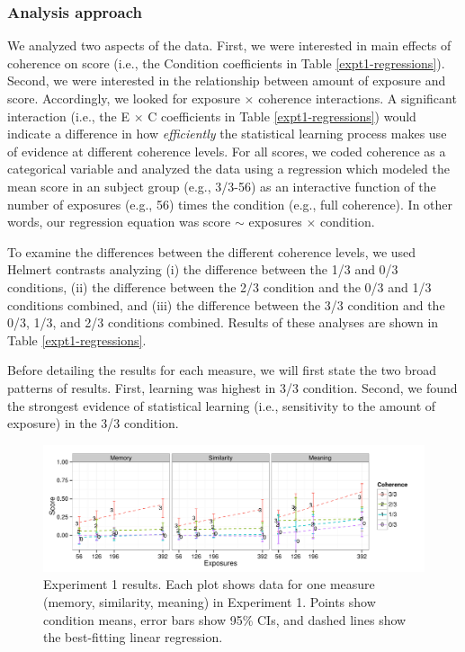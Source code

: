 \documentclass[man,floatsintext]{apa6}
\begin{document}
\subsubsection{Analysis approach}
We analyzed two aspects of the data. First, we were interested in main
effects of coherence on score (i.e., the Condition coefficients in
Table \ref{expt1-regressions}). Second, we were interested in the
relationship between amount of exposure and score. Accordingly, we
looked for exposure $\times$ coherence interactions. A significant
interaction (i.e., the E $\times$ C coefficients in Table
\ref{expt1-regressions}) would indicate a difference in how
\emph{efficiently} the statistical learning process makes use of
evidence at different coherence levels. For all scores, we coded
coherence as a categorical variable and analyzed the data using a
regression which modeled the mean score in an subject group (e.g.,
3/3-56) as an interactive function of the number of exposures (e.g.,
56) times the condition (e.g., full coherence). In other words, our
regression equation was score $\sim$ exposures $\times$ condition.

To examine the differences between the different coherence levels, we
used Helmert contrasts analyzing (i) the difference between the 1/3
and 0/3 conditions, (ii) the difference between the 2/3 condition and
the 0/3 and 1/3 conditions combined, and (iii) the difference between
the 3/3 condition and the 0/3, 1/3, and 2/3 conditions
combined. Results of these analyses are shown in Table
\ref{expt1-regressions}.

Before detailing the results for each measure, we will first state the
two broad patterns of results. First, learning was highest in 3/3
condition. Second, we found the strongest evidence of statistical
learning (i.e., sensitivity to the amount of exposure) in the 3/3
condition.


\begin{figure}[h]
  \begin{center}
    \includegraphics[width=1.0\linewidth]{x1.pdf}
    \caption{Experiment 1 results. Each plot shows data for one
      measure (memory, similarity, meaning) in Experiment 1. Points
      show condition means, error bars show 95\% CIs, and dashed lines
      show the best-fitting linear regression.}
    \label{expt1-results}
  \end{center}
\end{figure}
\end{document}
